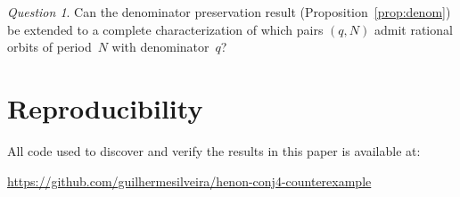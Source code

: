 \documentclass[11pt]{article}
\theoremstyle{definition}
\theoremstyle{remark}
\newtheorem{question}[theorem]{Question}
\begin{document}
\begin{question}\label{q:denomproof}
  Can the denominator preservation result (Proposition~\ref{prop:denom})
  be extended to a complete characterization of which pairs $(q, N)$ admit
  rational orbits of period~$N$ with denominator~$q$?
\end{question}


\section*{Reproducibility}

All code used to discover and verify the results in this paper is available at:
\begin{center}
  \url{https://github.com/guilhermesilveira/henon-conj4-counterexample}
\end{center}
\end{document}
